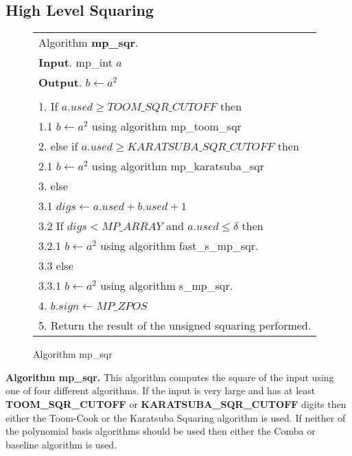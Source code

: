 \documentclass[b5paper]{book}
\begin{document}
\subsection{High Level Squaring}
\newpage\begin{figure}[!here]
\begin{small}
\begin{center}
\begin{tabular}{l}
\hline Algorithm \textbf{mp\_sqr}. \\
\textbf{Input}.   mp\_int $a$ \\
\textbf{Output}.  $b \leftarrow a^2$ \\
\hline \\
1.  If $a.used \ge TOOM\_SQR\_CUTOFF$ then  \\
\hspace{3mm}1.1  $b \leftarrow a^2$ using algorithm mp\_toom\_sqr \\
2.  else if $a.used \ge KARATSUBA\_SQR\_CUTOFF$ then \\
\hspace{3mm}2.1  $b \leftarrow a^2$ using algorithm mp\_karatsuba\_sqr \\
3.  else \\
\hspace{3mm}3.1  $digs \leftarrow a.used + b.used + 1$ \\
\hspace{3mm}3.2  If $digs < MP\_ARRAY$ and $a.used \le \delta$ then \\
\hspace{6mm}3.2.1  $b \leftarrow a^2$ using algorithm fast\_s\_mp\_sqr.  \\
\hspace{3mm}3.3  else \\
\hspace{6mm}3.3.1  $b \leftarrow a^2$ using algorithm s\_mp\_sqr.  \\
4.  $b.sign \leftarrow MP\_ZPOS$ \\
5.  Return the result of the unsigned squaring performed. \\
\hline
\end{tabular}
\end{center}
\end{small}
\caption{Algorithm mp\_sqr}
\end{figure}

\textbf{Algorithm mp\_sqr.}
This algorithm computes the square of the input using one of four different algorithms.  If the input is very large and has at least
\textbf{TOOM\_SQR\_CUTOFF} or \textbf{KARATSUBA\_SQR\_CUTOFF} digits then either the Toom-Cook or the Karatsuba Squaring algorithm is used.  If
neither of the polynomial basis algorithms should be used then either the Comba or baseline algorithm is used.  
\end{document}
